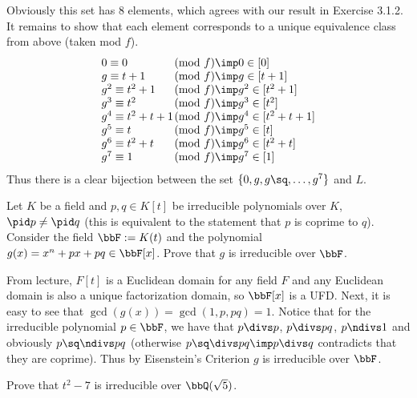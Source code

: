 \documentclass{article}
\begin{document}
\begin{solution}
Obviously this set has 8 elements, which agrees with our result in Exercise 3.1.2.
It remains to show that each element corresponds to a unique equivalence class from above (taken mod $ f $).
\[\begin{array}{lll}
  0   \equiv 0       &\!\!\!\!\!\!\!\!\pmod f \imp 0 \in [0] \\
  g   \equiv t+1     &\!\!\!\!\!\!\!\!\pmod f \imp g \in [t+1] \\
  g^2 \equiv t^2+1   &\!\!\!\!\!\!\!\!\pmod f \imp g^2 \in [t^2+1] \\
  g^3 \equiv t^2     &\!\!\!\!\!\!\!\!\pmod f \imp g^3 \in [t^2] \\
  g^4 \equiv t^2+t+1 &\!\!\!\!\!\!\!\!\pmod f \imp g^4 \in [t^2+t+1] \\
  g^5 \equiv t       &\!\!\!\!\!\!\!\!\pmod f \imp g^5 \in [t] \\
  g^6 \equiv t^2+t   &\!\!\!\!\!\!\!\!\pmod f \imp g^6 \in [t^2+t] \\
  g^7 \equiv 1       &\!\!\!\!\!\!\!\!\pmod f \imp g^7 \in [1]
\end{array}\]
Thus there is a clear bijection between the set $ \{0,g,g\sq,\ldots,g^7\} $ and $ L $.
\end{solution}

\begin{exercise}
Let $K$ be a field and $p, q \in K[t]$ be irreducible polynomials over $K$, $\pid p \neq \pid q$ (this is equivalent to the statement that $p$ is coprime to $q$). Consider the field $\bbF := K(t)$ and the polynomial $g(x) = x^n + px + pq \in \bbF[x]$. Prove that $g$ is irreducible over $\bbF$.
\end{exercise}

\begin{solution}
From lecture, $ F[t] $ is a Euclidean domain for any field $ F $ and any Euclidean domain is also a unique factorization domain, so $ \bbF[x] $ is a UFD.
Next, it is easy to see that $ \gcd(g(x)) = \gcd(1, p, pq) = 1 $.
Notice that for the irreducible polynomial $ p \in \bbF $, we have that $ p \divs p $, $ p\divs pq $, $ p\ndivs 1 $ and obviously $ p\sq \ndivs pq $ (otherwise $ p\sq\divs pq \imp p\divs q $ contradicts that they are coprime).
Thus by Eisenstein's Criterion $ g $ is irreducible over $ \bbF $.
\end{solution}

\begin{exercise}
Prove that $ t^2 -7 $ is irreducible over $ \bbQ(\sqrt 5) $.
\end{exercise}
\end{document}
